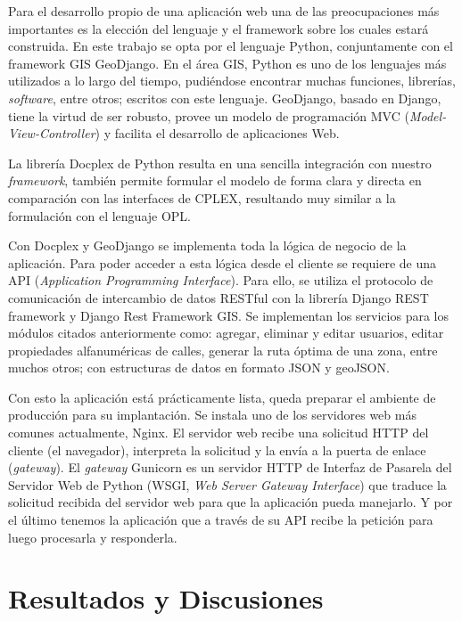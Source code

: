 \documentclass[spanish, conference]{IEEEtran}
\begin{document}
{Para el desarrollo propio de una aplicación web una de las preocupaciones más importantes es la elección del lenguaje y el framework sobre los cuales estará construida. En este trabajo se opta por el lenguaje Python, conjuntamente con el framework GIS GeoDjango. En el área GIS, Python es uno de los lenguajes más utilizados a lo largo del tiempo, pudiéndose encontrar muchas funciones, librerías, \textit{software}, entre otros; escritos con este lenguaje. GeoDjango, basado en Django, tiene la virtud de ser robusto, provee un modelo de programación MVC (\textit{Model-View-Controller}) y facilita el desarrollo de aplicaciones Web.

La librería Docplex de Python resulta en una sencilla integración con nuestro \textit{framework}, también permite formular el modelo de forma clara y directa en comparación con las interfaces de CPLEX, resultando muy similar a la formulación con el lenguaje OPL.

Con Docplex y GeoDjango se implementa toda la lógica de negocio de la aplicación. Para poder acceder a esta lógica desde el cliente se requiere de una API (\textit{Application Programming Interface}). Para ello, se utiliza el protocolo de comunicación de intercambio de datos RESTful con la librería Django REST framework y Django Rest Framework GIS. Se implementan los servicios para los módulos citados anteriormente como: agregar, eliminar y editar usuarios, editar propiedades alfanuméricas de calles, generar la ruta óptima de una zona, entre muchos otros; con estructuras de datos en formato JSON y geoJSON.

Con esto la aplicación está prácticamente lista, queda preparar el ambiente de producción para su implantación. Se instala uno de los servidores web más comunes actualmente, Nginx. El servidor web recibe una solicitud HTTP del cliente (el navegador), interpreta la solicitud y la envía a la puerta de enlace (\textit{gateway}). El \textit{gateway} Gunicorn es un servidor HTTP de Interfaz de Pasarela del Servidor Web de Python (WSGI, \textit{Web Server Gateway Interface}) que traduce la solicitud recibida del servidor web para que la aplicación pueda manejarlo. Y por el último tenemos la aplicación que a través de su API recibe la petición para luego procesarla y responderla.

\section{Resultados y Discusiones}

}
\end{document}
